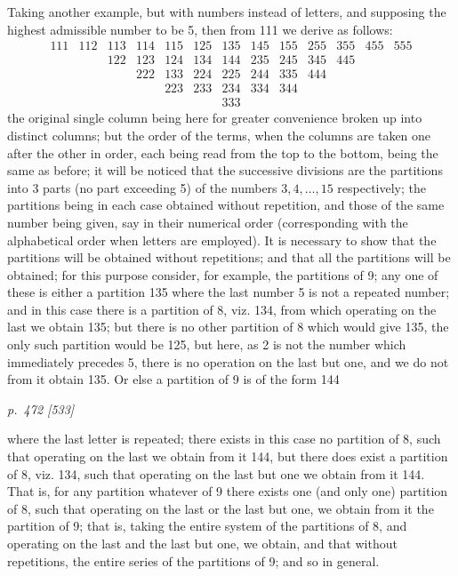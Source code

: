 \documentclass[11pt,a4paper]{article}
\theoremstyle{plain}
\theoremstyle{definition}
\begin{document}
Taking another example, but with numbers instead of letters, and supposing the highest
admissible number to be 5, then from 111 we derive as follows:
\[
\begin{array}{lllllllllllll}
111&112&113&114&115&125&135&145&155&255&355&455&555\\
   &   &122&123&124&134&144&235&245&345&445&   &   \\
   &   &   &222&133&224&225&244&335&444&   &   &   \\
   &   &   &   &223&233&234&334&344&   &   &   &   \\
   &   &   &   &   &   &333&   &   &   &   &   &
\end{array}
\]
the original single column being here for greater convenience broken up into distinct
columns; but the order of the terms, when the columns are taken one after the other in order,
each being read from the top to the bottom, being the same as before; it will be noticed that
the successive divisions are the partitions into 3 parts (no part exceeding 5) of the numbers
\(3,4,\ldots,15\) respectively; the partitions being in each case obtained without repetition,
and those of the same number being given, say in their numerical order (corresponding with
the alphabetical order when letters are employed). It is necessary to show that the partitions
will be obtained without repetitions; and that all the partitions will be obtained; for this
purpose consider, for example, the partitions of 9; any one of these is either a partition 135
where the last number 5 is not a repeated number; and in this case there is a partition of 8,
viz. 134, from which operating on the last we obtain 135; but there is no other partition of
8 which would give 135, the only such partition would be 125, but here, as 2 is not the number
which immediately precedes 5, there is no operation on the last but one, and we do not from it
obtain 135. Or else a partition of 9 is of the form 144

\clearpage

\bigskip
\textit{p.~472 [533]}
\smallskip

\noindent

where the last letter is repeated; there exists in this case no partition of 8, such that
operating on the last we obtain from it 144, but there does exist a partition of 8, viz. 134,
such that operating on the last but one we obtain from it 144. That is, for any partition
whatever of 9 there exists one (and only one) partition of 8, such that operating on the last
or the last but one, we obtain from it the partition of 9; that is, taking the entire system
of the partitions of 8, and operating on the last and the last but one, we obtain, and that
without repetitions, the entire series of the partitions of 9; and so in general.
\end{document}

